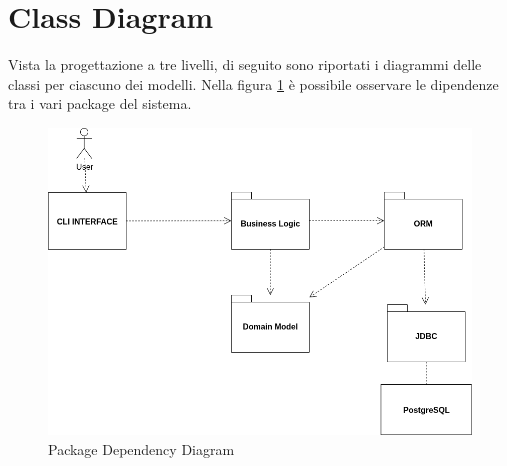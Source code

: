 \section{Class Diagram}
Vista la progettazione a tre livelli, di seguito sono riportati i diagrammi delle classi per ciascuno dei modelli.
Nella figura \ref{fig:pkdep} è possibile osservare le dipendenze tra i vari package del sistema.
\begin{figure}
    \centering
    \includegraphics[width=1\linewidth]{Images/PkgDeps.png}
    \caption{Package Dependency Diagram}
    \label{fig:pkdep}
\end{figure}
